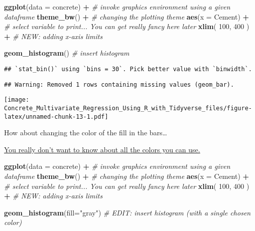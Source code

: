 \documentclass[]{article}
\newenvironment{Shaded}{\begin{snugshade}}{\end{snugshade}}
\newcommand{\CommentTok}[1]{\textcolor[rgb]{0.56,0.35,0.01}{\textit{#1}}}
\newcommand{\DataTypeTok}[1]{\textcolor[rgb]{0.13,0.29,0.53}{#1}}
\newcommand{\DecValTok}[1]{\textcolor[rgb]{0.00,0.00,0.81}{#1}}
\newcommand{\KeywordTok}[1]{\textcolor[rgb]{0.13,0.29,0.53}{\textbf{#1}}}
\newcommand{\NormalTok}[1]{#1}
\newcommand{\OperatorTok}[1]{\textcolor[rgb]{0.81,0.36,0.00}{\textbf{#1}}}
\newcommand{\StringTok}[1]{\textcolor[rgb]{0.31,0.60,0.02}{#1}}
\begin{document}
\begin{Shaded}
\begin{Highlighting}[]
\KeywordTok{ggplot}\NormalTok{(}\DataTypeTok{data =}\NormalTok{ concrete) }\OperatorTok{+}\StringTok{     }\CommentTok{# invoke graphics environment using a given dataframe}
\StringTok{  }
\StringTok{  }\KeywordTok{theme_bw}\NormalTok{() }\OperatorTok{+}\StringTok{                }\CommentTok{# changing the plotting theme}
\StringTok{  }
\StringTok{  }\KeywordTok{aes}\NormalTok{(}\DataTypeTok{x =}\NormalTok{ Cement) }\OperatorTok{+}\StringTok{           }\CommentTok{# select variable to print... You can get really fancy here later}
\StringTok{  }
\StringTok{  }\KeywordTok{xlim}\NormalTok{( }\DecValTok{100}\NormalTok{, }\DecValTok{400}\NormalTok{ ) }\OperatorTok{+}\StringTok{          }\CommentTok{# NEW: adding x-axis limits}

\StringTok{  }\KeywordTok{geom_histogram}\NormalTok{()            }\CommentTok{# insert histogram}
\end{Highlighting}
\end{Shaded}

\begin{verbatim}
## `stat_bin()` using `bins = 30`. Pick better value with `binwidth`.
\end{verbatim}

\begin{verbatim}
## Warning: Removed 1 rows containing missing values (geom_bar).
\end{verbatim}

\texttt{[image: Concrete\_Multivariate\_Regression\_Using\_R\_with\_Tidyverse\_files/figure-latex/unnamed-chunk-13-1.pdf]}

How about changing the color of the fill in the bars\ldots{}

\href{https://www.nceas.ucsb.edu/~frazier/RSpatialGuides/colorPaletteCheatsheet.pdf}{You
really don't want to know about all the colors you can use.}

\begin{Shaded}
\begin{Highlighting}[]
\KeywordTok{ggplot}\NormalTok{(}\DataTypeTok{data =}\NormalTok{ concrete) }\OperatorTok{+}\StringTok{     }\CommentTok{# invoke graphics environment using a given dataframe}
\StringTok{  }
\StringTok{  }\KeywordTok{theme_bw}\NormalTok{() }\OperatorTok{+}\StringTok{                }\CommentTok{# changing the plotting theme}
\StringTok{  }
\StringTok{  }\KeywordTok{aes}\NormalTok{(}\DataTypeTok{x =}\NormalTok{ Cement) }\OperatorTok{+}\StringTok{           }\CommentTok{# select variable to print... You can get really fancy here later}
\StringTok{  }
\StringTok{  }\KeywordTok{xlim}\NormalTok{( }\DecValTok{100}\NormalTok{, }\DecValTok{400}\NormalTok{ ) }\OperatorTok{+}\StringTok{          }\CommentTok{# NEW: adding x-axis limits}

\StringTok{  }\KeywordTok{geom_histogram}\NormalTok{(}\DataTypeTok{fill=}\StringTok{"gray"}\NormalTok{) }\CommentTok{# EDIT: insert histogram (with a single chosen color)}
\end{Highlighting}
\end{Shaded}
\end{document}
